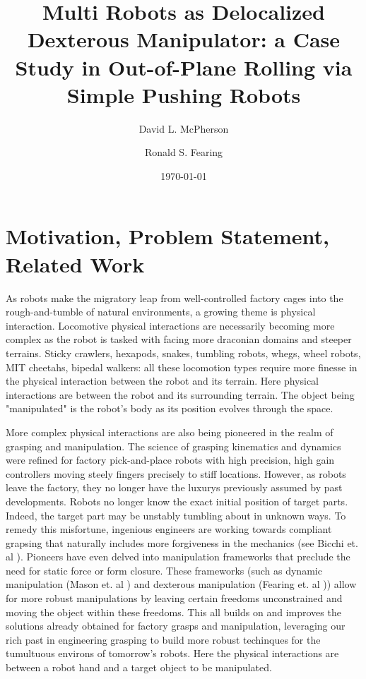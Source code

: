 \documentclass[runningheads,a4paper]{llncs}
\title{Multi Robots as Delocalized Dexterous Manipulator: a Case Study in Out-of-Plane Rolling via Simple Pushing Robots}
\author{David L. McPherson \and Ronald S. Fearing}
\institute{Biomimetic Millisystems Lab \\
University of California Berkeley \\
Department of Electrical Engineering and Computer Science
}
\date{\today}
\begin{document}
\maketitle

\section{Motivation, Problem Statement, Related Work}

As robots make the migratory leap from well-controlled factory cages into the rough-and-tumble of natural environments, a growing theme is physical interaction.
Locomotive physical interactions are necessarily becoming more complex as the robot is tasked with facing more draconian domains and steeper terrains.
Sticky crawlers, hexapods, snakes, tumbling robots, whegs, wheel robots, MIT cheetahs, bipedal walkers: all these locomotion types require more finesse in the physical interaction between the robot and its terrain.
Here physical interactions are between the robot and its surrounding terrain.
The object being "manipulated" is the robot's body as its position evolves through the space.

More complex physical interactions are also being pioneered in the realm of grasping and manipulation.
The science of grasping kinematics and dynamics were refined for factory pick-and-place robots with high precision, high gain controllers moving steely fingers precisely to stiff locations.
However, as robots leave the factory, they no longer have the luxurys previously assumed by past developments.
Robots no longer know the exact initial position of target parts.
Indeed, the target part may be unstably tumbling about in unknown ways.
To remedy this misfortune, ingenious engineers are working towards compliant grapsing that naturally includes more forgiveness in the mechanics (see Bicchi et. al \cite{BicchiCompliant}).
Pioneers have even delved into manipulation frameworks that preclude the need for static force or form closure.
These frameworks (such as dynamic manipulation (Mason et. al \cite{Lynch01011999}) and dexterous manipulation (Fearing et. al \cite{fearing1986simplified})) allow for more robust manipulations by leaving certain freedoms unconstrained and moving the object within these freedoms.
This all builds on and improves the solutions already obtained for factory grasps and manipulation, leveraging our rich past in engineering grasping to build more robust techinques for the tumultuous environs of tomorrow's robots.
Here the physical interactions are between a robot hand and a target object to be manipulated.
\end{document}
